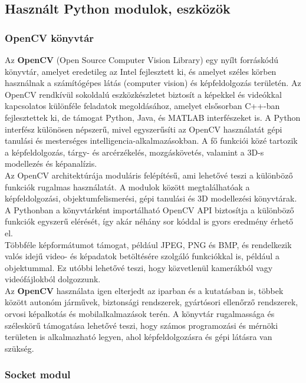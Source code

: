 \documentclass[12pt,a4paper]{article}
\newcommand{\code}[1]{\tcbox{\texttt{#1}}}
\begin{document}
\subsection{Használt Python modulok, eszközök}
\subsubsection*{OpenCV könyvtár \cite{opencv}}
Az \textbf{OpenCV} (Open Source Computer Vision Library) egy nyílt forráskódú könyvtár, amelyet eredetileg az Intel fejlesztett ki, és amelyet széles körben használnak a számítógépes látás (computer vision) és képfeldolgozás területén. Az OpenCV rendkívül sokoldalú eszközkészletet biztosít a képekkel és videókkal kapcsolatos különféle feladatok megoldásához, amelyet elsősorban C++-ban fejlesztettek ki, de támogat Python, Java, és MATLAB interfészeket is. A Python interfész különösen népszerű, mivel egyszerűsíti az OpenCV használatát gépi tanulási és mesterséges intelligencia-alkalmazásokban. A fő funkciói közé tartozik a képfeldolgozás, tárgy- és arcérzékelés, mozgáskövetés, valamint a 3D-s modellezés és képanalízis.\\

Az OpenCV architektúrája moduláris felépítésű, ami lehetővé teszi a különböző funkciók rugalmas használatát. A modulok között megtalálhatóak a képfeldolgozási, objektumfelismerési, gépi tanulási és 3D modellezési könyvtárak. A Pythonban a \code{cv2} könyvtárként importálható OpenCV API biztosítja a különböző funkciók egyszerű elérését, így akár néhány sor kóddal is gyors eredmény érhető el.\\

Többféle képformátumot támogat, például JPEG, PNG és BMP, és rendelkezik valós idejű video- és képadatok betöltésére szolgáló funkciókkal is, például a \code{VideoCapture} objektummal. Ez utóbbi lehetővé teszi, hogy közvetlenül kamerákból vagy videófájlokból dolgozzunk.\\

Az \textbf{OpenCV }használata igen elterjedt az iparban és a kutatásban is, többek között autonóm járművek, biztonsági rendszerek, gyártósori ellenőrző rendszerek, orvosi képalkotás és mobilalkalmazások terén. A könyvtár rugalmassága és széleskörű támogatása lehetővé teszi, hogy számos programozási és mérnöki területen is alkalmazható legyen, ahol képfeldolgozásra és gépi látásra van szükség.

\subsubsection*{Socket modul \cite{socket}}
\end{document}
